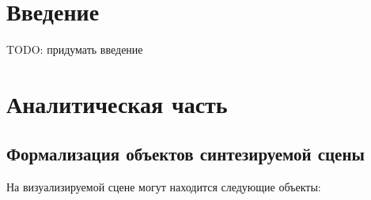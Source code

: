 \documentclass[a4paper,14pt, unknownkeysallowed]{extreport}
\begin{document}
\setcounter{page}{4}
\renewcommand{\contentsname}{Содержание} 
\tableofcontents


\setcounter{page}{5}
\chapter{Введение}

TODO: придумать введение





\chapter{Аналитическая часть}



\section[Формализация объектов синтезируемой сцены]{Формализация объектов синтезируемой сцены}
На визуализируемой сцене могут находится следующие объекты:
\end{document}
